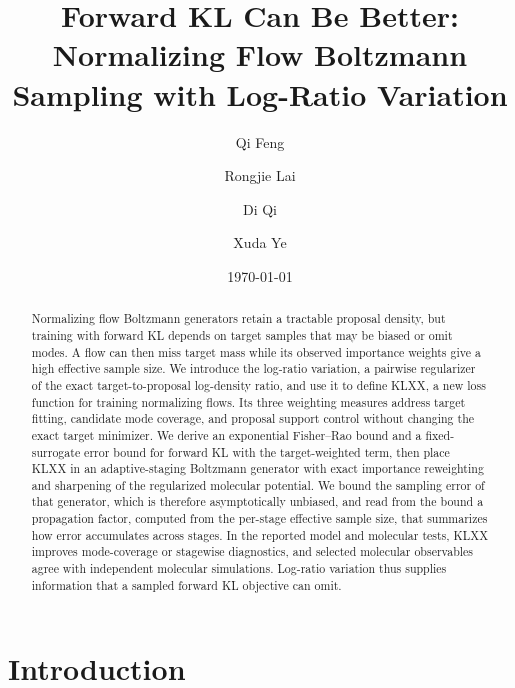 \documentclass{article}
\title{Forward KL Can Be Better: Normalizing Flow Boltzmann Sampling with Log-Ratio Variation}
\author[1]{Qi Feng}
\author[2]{Rongjie Lai}
\author[2]{Di Qi}
\author[2]{Xuda Ye}
\affil[1]{Department of Mathematics, Florida State University, Tallahassee, FL 32306}
\affil[2]{Department of Mathematics, Purdue University, West Lafayette, IN 47907}
\date{\today}
\begin{document}
\maketitle

\begin{abstract}
Normalizing flow Boltzmann generators retain a tractable proposal density, but training with forward KL depends on target samples that may be biased or omit modes. A flow can then miss target mass while its observed importance weights give a high effective sample size. We introduce the log-ratio variation, a pairwise regularizer of the exact target-to-proposal log-density ratio, and use it to define KLXX, a new loss function for training normalizing flows. Its three weighting measures address target fitting, candidate mode coverage, and proposal support control without changing the exact target minimizer. We derive an exponential Fisher--Rao bound and a fixed-surrogate error bound for forward KL with the target-weighted term, then place KLXX in an adaptive-staging Boltzmann generator with exact importance reweighting and sharpening of the regularized molecular potential. We bound the sampling error of that generator, which is therefore asymptotically unbiased, and read from the bound a propagation factor, computed from the per-stage effective sample size, that summarizes how error accumulates across stages. In the reported model and molecular tests, KLXX improves mode-coverage or stagewise diagnostics, and selected molecular observables agree with independent molecular simulations. Log-ratio variation thus supplies information that a sampled forward KL objective can omit.
\end{abstract}

\par\medskip
\noindent{}
\par\medskip

\section{Introduction}
\label{sec: intro}
\end{document}
